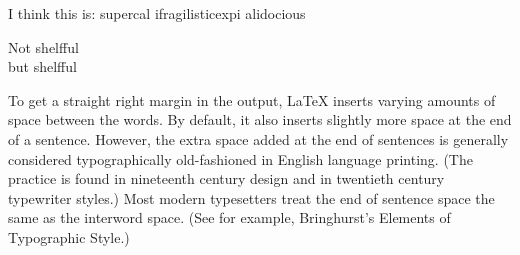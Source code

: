 \documentclass{article}
\begin{document}
\begin{minipage}{2in}
I think this is: su\-per\-cal\-%
i\-frag\-i\-lis\-tic\-ex\-pi\-%
al\-i\-do\-cious
\end{minipage}

\Large Not shelfful\\
but shelf{}ful


\blindtext %
\Blindtext

\frenchspacing
To get a straight right margin in the output, LaTeX inserts varying amounts of space between the words. By default, it also inserts slightly more space at the end of a sentence. However, the extra space added at the end of sentences is generally considered typographically old-fashioned in English language printing. (The practice is found in nineteenth century design and in twentieth century typewriter styles.) Most modern typesetters treat the end of sentence space the same as the interword space. (See for example, Bringhurst's Elements of Typographic Style.)
\nonfrenchspacing
\end{document}
